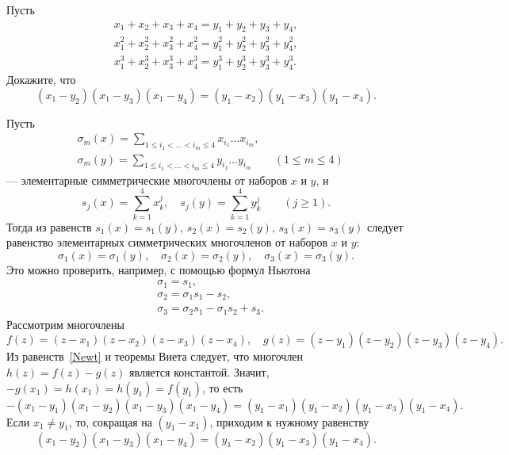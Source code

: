 \problem
Пусть
\begin{gather*}
    x_1 + x_2 + x_3 + x_4 = y_1 + y_2 + y_3 + y_4
,\\
    x_1^2 + x_2^2 + x_3^2 + x_4^2
=
    y_1^2 + y_2^2 + y_3^2 + y_4^2
,\\
    x_1^3 + x_2^3 + x_3^3 + x_4^3
=
    y_1^3 + y_2^3 + y_3^3 + y_4^3
.\end{gather*}
Докажите, что
\[
    (x_1 - y_2) (x_1 - y_3) (x_1 - y_4)
=
    (y_1 - x_2) (y_1 - x_3) (y_1 - x_4)
.\]

\solution
Пусть
\begin{align*}&
    \sigma_m(x)
=
    \sum\limits_{1 \leq i_1 < \ldots < i_m \leq 4}
        x_{i_1} \ldots x_{i_m}
,\\&
    \sigma_m(y)
=
    \sum\limits_{1 \leq i_1 < \ldots < i_m \leq 4}
        y_{i_1} \ldots y_{i_m}
\qquad
    (1 \leq m \leq 4)
\end{align*}
--- элементарные симметрические многочлены от наборов $x$ и $y$, и
\[
    s_j(x)
=
    \sum\limits_{k = 1}^{4}
        x_k^j
,\quad
    s_j(y)
=
    \sum\limits_{k = 1}^{4}
        y_k^j
\qquad
    (j \geq 1)
.\]
Тогда из равенств $s_1(x) = s_1(y)$, $s_2(x) = s_2(y)$, $s_3(x) = s_3(y)$
следует равенство элементарных симметрических многочленов
от наборов $x$ и $y$:
\begin{equation} \label{Newt}
    \sigma_1(x) = \sigma_1(y)
,\quad
    \sigma_2(x) = \sigma_2(y)
,\quad
    \sigma_3(x) = \sigma_3(y)
.\end{equation}
Это можно проверить, например, с помощью формул Ньютона
\begin{align*}&
    \sigma_1 = s_1
,\\&
    \sigma_2 = \sigma_1 s_1 - s_2
,\\&
    \sigma_3 = \sigma_2 s_1 - \sigma_1 s_2 + s_3
.\end{align*}
Рассмотрим многочлены
\[
    f(z) = (z - x_1) (z - x_2) (z - x_3) (z - x_4)
,\quad
    g(z) = (z - y_1) (z - y_2) (z - y_3) (z - y_4)
.\]
Из равенств~\eqref{Newt} и теоремы Виета следует, что многочлен
$h(z) = f(z) - g(z)$ является константой.
Значит, $-g(x_1) = h(x_1) = h(y_1) = f(y_1)$, то есть
\begin{equation} \label{hh}
    - (x_1 - y_1) (x_1-y_2) (x_1 - y_3) (x_1 - y_4)
=
    (y_1 - x_1) (y_1 - x_2) (y_1 - x_3) (y_1 - x_4)
.\end{equation}
Если $x_1 \neq y_1$, то, сокращая на $(y_1 - x_1)$, приходим к нужному
равенству
\begin{equation} \label{Nuzh}
    (x_1 - y_2) (x_1 - y_3) (x_1 - y_4)
=
    (y_1 - x_2) (y_1 - x_3) (y_1 - x_4)
.\end{equation}
